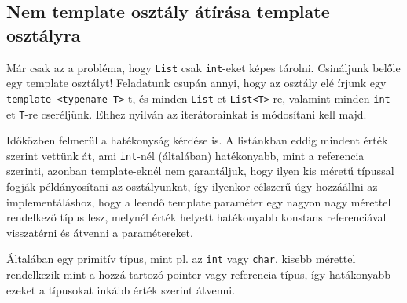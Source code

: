 \documentclass[a4paper,11.5pt,table]{article}
\begin{document}
	\subsection{Nem template osztály átírása template osztályra}
	Már csak az a probléma, hogy \texttt{List} csak \texttt{int}-eket képes tárolni. Csináljunk belőle egy template osztályt! Feladatunk csupán annyi, hogy az osztály elé írjunk egy \texttt{template <typename T>}-t, és minden \texttt{List}-et \texttt{List<T>}-re, valamint minden \texttt{int}-et \texttt{T}-re cseréljünk. Ehhez nyilván az iterátorainkat is módosítani kell majd.
	
	\medskip
	Időközben felmerül a hatékonyság kérdése is. A listánkban eddig mindent érték szerint vettünk át, ami \texttt{int}-nél (általában) hatékonyabb, mint a referencia szerinti, azonban template-eknél nem garantáljuk, hogy ilyen kis méretű típussal fogják példányosítani az osztályunkat, így ilyenkor célszerű úgy hozzáállni az implementáláshoz, hogy a leendő template paraméter egy nagyon nagy mérettel rendelkező típus lesz, melynél érték helyett hatékonyabb konstans referenciával visszatérni és átvenni a paramétereket.
	\begin{note}
		Általában egy primitív típus, mint pl. az \texttt{int} vagy \texttt{char}, kisebb mérettel rendelkezik mint a hozzá tartozó pointer vagy referencia típus, így hatákonyabb ezeket a típusokat inkább érték szerint átvenni.
	\end{note}
	
\end{document}
